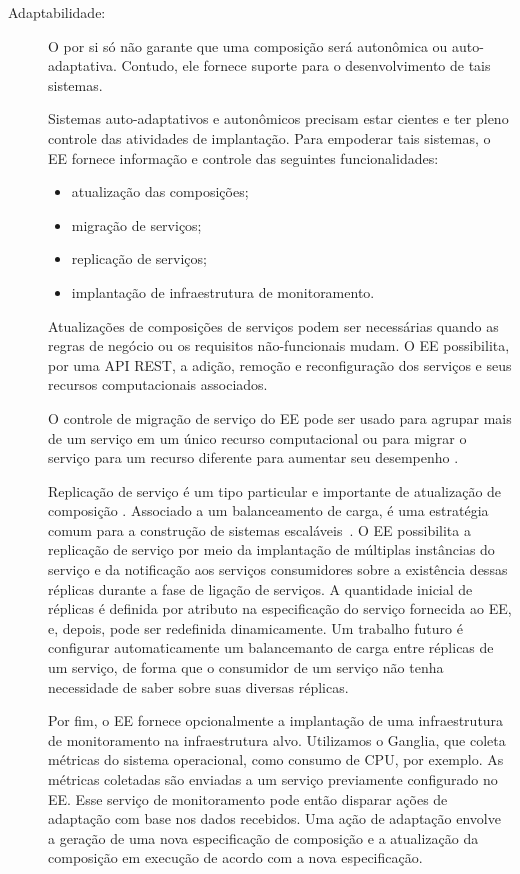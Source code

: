 \begin{description}
\item [Adaptabilidade:]

O \ee por si só não garante que uma composição será autonômica ou auto-adaptativa.
Contudo, ele fornece suporte para o desenvolvimento de tais sistemas.

Sistemas auto-adaptativos e autonômicos precisam estar cientes
e ter pleno controle das atividades de implantação.
Para empoderar  tais sistemas, o EE fornece informação e controle
das seguintes funcionalidades:

\begin{itemize}
\item atualização das composições;
\item migração de serviços;
\item replicação de serviços;
\item implantação de infraestrutura de monitoramento.
\end{itemize}

Atualizações de composições de serviços podem ser necessárias quando
as regras de negócio ou os requisitos não-funcionais mudam.
O EE possibilita, por uma API REST, a adição, remoção e reconfiguração dos serviços
e seus recursos computacionais associados.

O controle de migração de serviço do EE pode ser usado para 
agrupar mais de um serviço em um único
recurso computacional ou para migrar o serviço para um recurso diferente
para aumentar seu desempenho .

Replicação de serviço é um tipo particular e importante de atualização de composição
.
Associado a um balanceamento de carga, é uma estratégia comum para
a construção de sistemas escaláveis~\cite{Amazon2012Practices}.
O EE possibilita a replicação de serviço por meio da implantação de
múltiplas instâncias do serviço e da notificação aos serviços consumidores
sobre a existência dessas réplicas durante a fase de ligação de serviços.
A quantidade inicial de réplicas é definida por atributo na especificação
do serviço fornecida ao EE, e, depois, pode ser redefinida dinamicamente.
Um trabalho futuro é configurar automaticamente um balancemanto de carga
entre réplicas de um serviço, de forma que o consumidor de um serviço
não tenha necessidade de saber sobre suas diversas réplicas.

Por fim, o EE fornece opcionalmente a implantação de uma infraestrutura de monitoramento na infraestrutura alvo.
Utilizamos o Ganglia, que coleta métricas do sistema operacional, como consumo de CPU, por exemplo.
As métricas coletadas são enviadas a um serviço previamente configurado no EE.
Esse serviço de monitoramento pode então disparar ações de adaptação com base
nos dados recebidos. Uma ação de adaptação envolve a geração de uma nova especificação
de composição e a atualização da composição em execução de acordo com a nova especificação.


\end{description}
